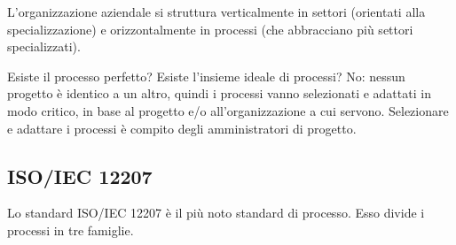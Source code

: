 \documentclass[a4paper]{article}
\begin{document}
		
L'organizzazione aziendale si struttura verticalmente in settori (orientati alla specializzazione) e orizzontalmente in processi (che abbracciano più settori specializzati).
		
Esiste il processo perfetto? Esiste l'insieme ideale di processi? No: nessun progetto è identico a un altro, quindi i processi vanno selezionati e adattati in modo critico, in base al progetto e/o all'organizzazione a cui servono. Selezionare e adattare i processi è compito degli amministratori di progetto.

		
	\subsection{ISO/IEC 12207}

		
Lo standard ISO/IEC 12207 è il più noto standard di processo. Esso divide i processi in tre famiglie.
		
\end{document}
